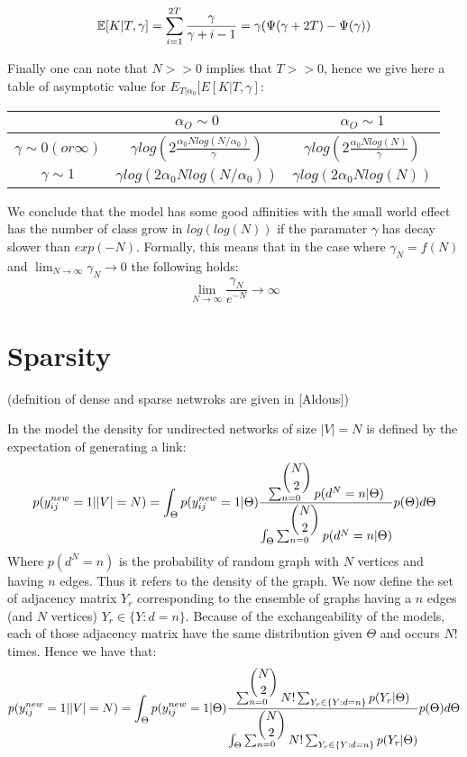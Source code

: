 \documentclass[a4paper, 12pt]{article}
\begin{document}
\begin{equation}
\mathbb{E}[K|T, \gamma] = \sum_{i=1}^{2T} \frac{\gamma}{\gamma +i-1} = \gamma (\Psi(\gamma+2T) - \Psi(\gamma))
\end{equation}

Finally one can note that $N >> 0$ implies that $T>>0$, hence we give here a table of asymptotic value for $E_{T|\alpha_0}[E[K|T, \gamma]$:

	\begin{tabular}{c|cc}
		 & $\alpha_O \sim 0$&$\alpha_O \sim 1$ \\
		\hline
		$\gamma \sim 0 (or \infty)$ & $\gamma log(2\frac{\alpha_0Nlog(N/\alpha_0)}{\gamma})$ & $\gamma log(2\frac{\alpha_0Nlog(N)}{\gamma})$ \\
		$\gamma \sim 1$ & $\gamma log(2\alpha_0Nlog(N/\alpha_0))$ &  $\gamma log(2\alpha_0Nlog(N))$
	\end{tabular}

We conclude that the model has some good affinities with the small world effect has the number of class grow in $log(log(N))$ if the paramater $\gamma$ has decay slower than $exp(-N)$. Formally, this means that in the case where  $\gamma_N = f(N)$ and $\lim_{N\to\infty}\gamma_N \to 0$ the following holds:
$$\lim_{N\to\infty} \frac{\gamma_N}{e^{-N}} \to \infty$$


\section{Sparsity}
(defnition of dense and sparse netwroks are given in [Aldous])


In the model the density for undirected networks of size $|V|=N$ is defined by the expectation of generating a link:
\begin{equation}
p(y_{ij}^{new}=1| |V|=N) =  \int_{\Theta} p(y_{ij}^{new}=1|\Theta) \frac{\sum_{n=0}^{\dbinom{N}{2}} p(d^N=n| \Theta)}{\int_{\Theta} \sum_{n=0}^{\dbinom{N}{2}} p(d^N=n | \Theta)} p(\Theta) d\Theta
\end{equation}
Where  $p(d^N=n)$ is the probability of random graph with $N$ vertices and having $n$ edges. Thus it refers to the density of the graph. We now define the set of  adjacency matrix $Y_r$ corresponding to the ensemble of graphs having a $n$ edges (and $N$ vertices) $Y_r \in \{Y: d=n\}$. Because of the exchangeability of the models, each of those adjacency matrix have the same distribution given $\Theta$ and occurs $N!$ times. Hence we have that:
\begin{equation}
p(y_{ij}^{new}=1| |V|=N) =  \int_{\Theta} p(y_{ij}^{new}=1|\Theta) \frac{\sum_{n=0}^{\dbinom{N}{2}} N! \sum_{Y_r \in \{Y: d=n\}} p(Y_r| \Theta)}{\int_{\Theta} \sum_{n=0}^{\dbinom{N}{2}} N! \sum_{Y_r \in \{Y: d=n\}} p(Y_r | \Theta)} p(\Theta) d\Theta
\end{equation}
\end{document}

